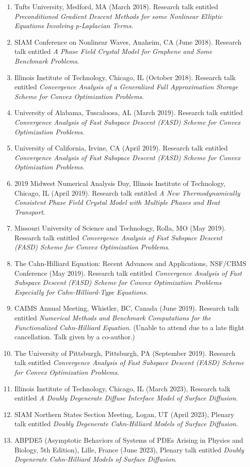 \documentclass[11pt]{letter}
\begin{document}
\begin{enumerate}
	\item
Tufts University, Medford, MA (March 2018).  Research talk entitled {\sl Preconditioned Gradient Descent Methods for some Nonlinear Elliptic Equations Involving p-Laplacian Terms}.
	\item
SIAM Conference on Nonlinear Waves, Anaheim, CA (June 2018). Research talk entitled {\sl A Phase Field Crystal Model for Graphene and Some Benchmark Problems}.
	\item
Illinois Institute of Technology, Chicago, IL (October 2018).  Research talk entitled {\sl Convergence Analysis of a Generalized Full Approximation Storage Scheme for Convex Optimization Problems}.
	\item
University of Alabama, Tuscaloosa, AL (March 2019).  Research talk entitled {\sl Convergence Analysis of Fast Subspace Descent (FASD) Scheme for Convex Optimization Problems}.
	\item
University of California, Irvine, CA (April 2019).  Research talk entitled {\sl Convergence Analysis of Fast Subspace Descent (FASD) Scheme for Convex Optimization Problems}.
	\item
2019 Midwest Numerical Analysis Day, Illinois Institute of Technology, Chicago, IL (April 2019).  Research talk entitled {\sl A New Thermodynamically Consistent Phase Field Crystal Model with Multiple Phases and Heat Transport}.
	\item
Missouri University of Science and Technology, Rolla, MO (May 2019).  Research talk entitled {\sl Convergence Analysis of Fast Subspace Descent (FASD) Scheme for Convex Optimization Problems}.
	\item
The Cahn-Hilliard Equation: Recent Advances and Applications, NSF/CBMS Conference (May 2019). Research talk entitled {\sl Convergence Analysis of Fast Subspace Descent (FASD) Scheme for Convex Optimization Problems Especially for Cahn-Hilliard-Type Equations}.
	\item
CAIMS Annual Meeting, Whistler, BC, Canada (June 2019). Research talk entitled {\sl Numerical Methods and Benchmark Computations for the Functionalized Cahn-Hilliard Equation}. (Unable to attend due to a late flight cancellation. Talk given by a co-author.)
	\item
The University of Pittsburgh, Pittsburgh, PA (September 2019).  Research talk entitled {\sl Convergence Analysis of Fast Subspace Descent (FASD) Scheme for Convex Optimization Problems}.
	\item
Illinois Institute of Technology, Chicago, IL (March 2023), Research talk entitled {\sl A Doubly Degenerate Diffuse Interface Model of Surface Diffusion}.
	\item
SIAM Northern States Section Meeting, Logan, UT (April 2023), Plenary talk entitled {\sl Doubly Degenerate Cahn-Hilliard Models of Surface Diffusion}.
	\item
ABPDE5 (Asymptotic Behaviors of Systems of PDEs Arising in Physics and Biology, 5th Edition), Lille, France (June 2023), Plenary talk entitled {\sl Doubly Degenerate Cahn-Hilliard Models of Surface Diffusion}.


\end{enumerate}
\end{document}
